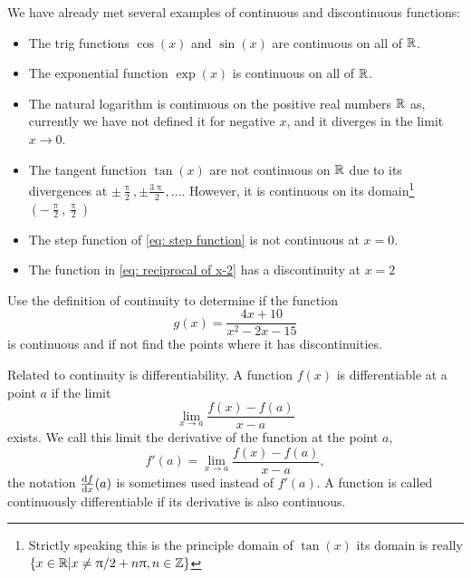 \begin{ex}
We have already met several examples of continuous and discontinuous functions:
\begin{itemize}
    \item The trig functions $\cos(x)$ and $\sin(x)$ are continuous on all of $\mathbb{R}$.
    \item The exponential function $\exp(x)$ is continuous on all of $\mathbb{R}$.
   \item The natural logarithm is continuous on the positive real numbers $\mathbb{R}$ as, currently we have not defined it for negative $x$, and it diverges in the limit $x\to 0$.
   \item The tangent function $\tan(x)$ are not continuous on $\mathbb{R}$ due to its divergences at $\pm\frac{\uppi}{2},\pm\frac{3\uppi}{2},\dots{}$. However, it is continuous on its domain\footnote{Strictly speaking this is the principle domain of $\tan(x)$ its domain is really $\{x\in \mathbb{R}\vert x\neq \uppi/2 +n\uppi, n\in \mathbb{Z}\}$} $\left(-\frac{\uppi}{2},\frac{\uppi}{2}\right)$
   \item The step function of \cref{eq: step function} is not continuous at $x=0$.
\item The function in \cref{eq: reciprocal of x-2} has a discontinuity at $x=2$
\end{itemize}
\end{ex}
\begin{exercise}
Use the definition of continuity to determine if the function
\begin{equation}
g(x)=\frac{4x+10}{x^{2}-2x-15}
\end{equation}
is continuous and if not find the points where it has discontinuities.
\end{exercise}

Related to continuity is differentiability. A function $f(x)$ is differentiable at a point $a$ if the limit
\begin{equation*}
\lim_{x\to a}\frac{f(x)-f(a)}{x-a}
\end{equation*}
exists. We call this limit the derivative of the function at the point $a$,
\begin{equation}
f'(a)=\lim_{x\to a}\frac{f(x)-f(a)}{x-a},
\label{eq: rate of change at a}
\end{equation}
the notation $\frac{\mathrm{d} f}{\mathrm{d} x}(a)$ is sometimes used instead of $f'(a)$. A function is called continuously differentiable if its derivative is also continuous.\\

